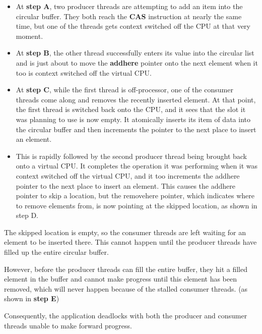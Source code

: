 \documentclass[12pt,a4paper]{report}
\begin{document}
\begin{itemize}
\item  At \textbf{step A}, two producer threads are attempting to add an item into the circular buffer. They both reach the \textbf{CAS} instruction at nearly the same time, but one of the threads gets context switched off the CPU at that very moment.
\item At \textbf{step B}, the other thread successfully enters its value into the circular list and is just about to move the \textbf{addhere} pointer onto the next element when it too is context switched off the virtual CPU.
\item At\textbf{ step C}, while the first thread is off-processor, one of the consumer threads come along and removes the recently inserted element. At that point, the first thread is switched back onto the CPU, and it sees that the slot it was planning to use is now empty. It atomically inserts its item of data into the circular buffer and then increments the pointer to the next place to insert an element.
\item This is rapidly followed by the second producer thread being brought back onto a virtual CPU. It completes the operation it was performing when it was context switched off the virtual CPU, and it too increments the addhere pointer to the next place to insert an element. This causes the addhere pointer to skip a location, but the removehere pointer, which indicates where to remove elements from, is now pointing at the skipped location, as shown in step D.
\end{itemize}
The skipped location is empty, so the consumer threads are left waiting for an element to be inserted there. This cannot happen until the producer threads have filled up the entire circular buffer.
\par
However, before the producer threads can fill the entire buffer, they hit a filled element in the buffer and cannot make progress until this element has been removed, which will never happen because of the stalled consumer threads. (as shown in \textbf{step E})
\par
Consequently, the application deadlocks with both the producer and consumer threads unable to make forward progress.
\end{document}
